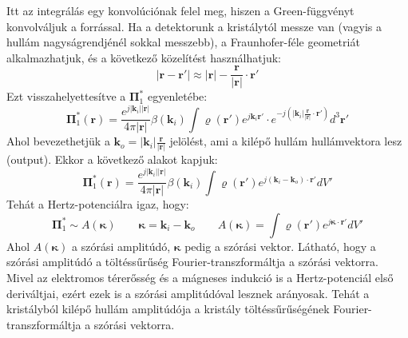 \documentclass[../main.tex]{subfiles}
\begin{document}
Itt az integrálás egy konvolúciónak felel meg, hiszen a Green-függvényt konvolváljuk a forrással.
Ha a detektorunk a kristálytól messze van (vagyis a hullám nagyságrendjénél sokkal messzebb), a Fraunhofer-féle geometriát alkalmazhatjuk, és a következő közelítést használhatjuk:
\begin{equation}
    |\mathbf{r} - \mathbf{r}'| \approx |\mathbf{r}| - \frac{\mathbf{r}}{|\mathbf{r}|} \cdot \mathbf{r}'
\end{equation}
Ezt visszahelyettesítve a $\mathbf{\Pi}_1^*$ egyenletébe:
\begin{equation}
    \mathbf{\Pi}_{1}^*(\mathbf{r}) = \frac{e^{j |\mathbf{k}_i| |\mathbf{r}|}}{4 \pi |\mathbf{r}|} \beta(\mathbf{k}_i) \int \varrho(\mathbf{r}') e^{j \mathbf{k}_i \mathbf{r}'} \cdot e^{-j \left(|\mathbf{k}_i| \frac{\mathbf{r}}{|\mathbf{r}|} \cdot \mathbf{r}'\right)} d^3 \mathbf{r}'
\end{equation}
Ahol bevezethetjük a $\mathbf{k}_o = |\mathbf{k}_i| \frac{\mathbf{r}}{|\mathbf{r}|}$ jelölést, ami a kilépő hullám hullámvektora lesz (output). Ekkor a következő alakot kapjuk:
\begin{equation}
    \mathbf{\Pi}_{1}^*(\mathbf{r}) = \frac{e^{j |\mathbf{k}_i| |\mathbf{r}|}}{4 \pi |\mathbf{r}|} \beta(\mathbf{k}_i) \int \varrho(\mathbf{r}') e^{j (\mathbf{k}_i - \mathbf{k}_o) \cdot \mathbf{r}'} d V'
\end{equation}
Tehát a Hertz-potenciálra igaz, hogy:
\begin{equation}
    \mathbf{\Pi}_1^* \sim A(\boldsymbol{\kappa}) \qquad \boldsymbol{\kappa} = \mathbf{k}_i - \mathbf{k}_o \qquad A(\boldsymbol{\kappa}) = \int \varrho(\mathbf{r}') e^{j \boldsymbol{\kappa} \cdot \mathbf{r}'} d V'
\end{equation}
Ahol $A(\boldsymbol{\kappa})$ a szórási amplitúdó, $\boldsymbol{\kappa}$ pedig a szórási vektor. Látható, hogy a szórási amplitúdó a töltéssűrűség Fourier-transzformáltja a szórási vektorra. Mivel 
az elektromos térerősség és a mágneses indukció is a Hertz-potenciál első deriváltjai, ezért ezek is a szórási amplitúdóval lesznek arányosak. Tehát a kristályból kilépő hullám amplitúdója
a kristály töltéssűrűségének Fourier-transzformáltja a szórási vektorra.
\end{document}
